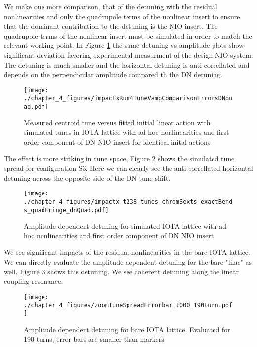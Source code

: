 We make one more comparison, that of the detuning with the residual nonlinearities and only the quadrupole terms of the nonlinear insert to ensure that the dominant contribution to the detuning is the NIO insert. The quadrupole terms of the nonlinear insert must be simulated in order to match the relevant working point. In Figure \ref{fig:t238ampDetuneQuad} the same detuning vs amplitude plots show significant deviation favoring experimental measurment of the design NIO system. The detuning is much smaller and the horizontal detuning is anti-correllated and depends on the perpendicular amplitude compared th the DN detuning.

\begin{figure}
	\centering
	\texttt{[image: ./chapter\_4\_figures/impactxRun4TuneVampComparisonErrorsDNquad.pdf]}
	\caption{Measured centroid tune versus fitted initial linear action with simulated tunes in IOTA lattice with ad-hoc nonlinearities and first order component of DN NIO insert for identical inital actions}
	\label{fig:t238ampDetuneQuad}
\end{figure}

The effect is more striking in tune space, Figure \ref{fig:t238detuneQuad} shows the simulated tune spread for configuration S3. Here we can clearly see the anti-correllated horizontal detuning across the opposite side of the DN tune shift.

\begin{figure}
	\centering
	\texttt{[image: ./chapter\_4\_figures/impactx\_t238\_tunes\_chromSexts\_exactBends\_quadFringe\_dnQuad.pdf]}
	\caption{Amplitude dependent detuning for simulated IOTA lattice with ad-hoc nonlinearities and first order component of DN NIO insert}
	\label{fig:t238detuneQuad}
\end{figure}

We see significant impacts of the residual nonlinearities in the bare IOTA lattice. We can directly evaluate the amplitude dependent detuning for the bare "lilac" as well. Figure \ref{fig:t0detune} shows this detuning. We see coherent detuning along the linear coupling resonance.

\begin{figure}
	\centering
	\texttt{[image: ./chapter\_4\_figures/zoomTuneSpreadErrorbar\_t000\_190turn.pdf]}
	\caption{Amplitude dependent detuning for bare IOTA lattice. Evaluated for 190 turns, error bars are smaller than markers}
	\label{fig:t0detune}
\end{figure}


